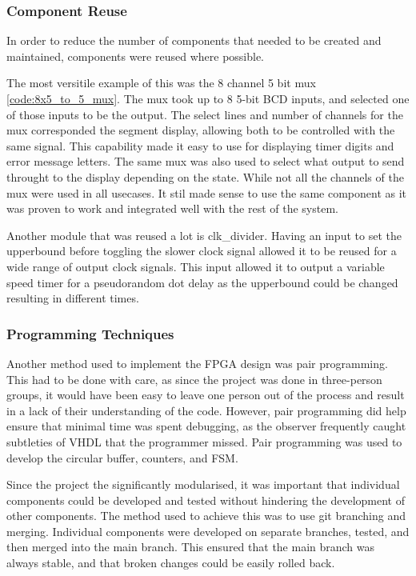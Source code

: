 \documentclass[11pt]{article}
\begin{document}
\subsubsection{Component Reuse}

In order to reduce the number of components that needed to be created and maintained, components were reused where possible. 

The most versitile example of this was the 8 channel 5 bit mux \ref{code:8x5_to_5_mux}. The mux took up to 8 5-bit BCD inputs, and selected one of those inputs to be the output. The select lines and number of channels for the mux corresponded the segment display, allowing both to be controlled with the same signal. This capability made it easy to use for displaying timer digits and error message letters. The same mux was also used to select what output to send throught to the display depending on the state. While not all the channels of the mux were used in all usecases. It stil made sense to use the same component as it was proven to work and integrated well with the rest of the system.

Another module that was reused a lot is clk\_divider. Having an input to set the upperbound before toggling the slower clock signal allowed it to be reused for a wide range of output clock signals. This input allowed it to output a variable speed timer for a pseudorandom dot delay as the upperbound could be changed resulting in different times.

\subsubsection{Programming Techniques}

Another method used to implement the FPGA design was pair programming. This had to be done with care, as since the project was done in three-person groups, it would have been easy to leave one person out of the process and result in a lack of their understanding of the code. However, pair programming did help ensure that minimal time was spent debugging, as the observer frequently caught subtleties of VHDL that the programmer missed. Pair programming was used to develop the circular buffer, counters, and FSM.

Since the project the significantly modularised, it was important that individual components could be developed and tested without hindering the development of other components. The method used to achieve this was to use git branching and merging. Individual components were developed on separate branches, tested, and then merged into the main branch. This ensured that the main branch was always stable, and that broken changes could be easily rolled back.
\end{document}
